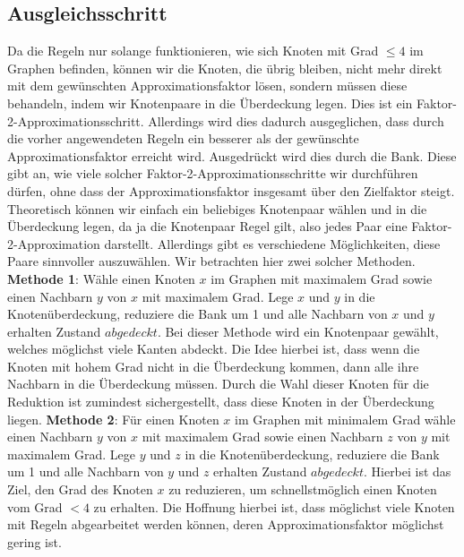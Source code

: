 \documentclass[12pt,onecolumn, notitlepage]{scrartcl}
\begin{document}
\subsection{Ausgleichsschritt}\label{subsec:AS}
Da die Regeln nur solange funktionieren, wie sich Knoten mit Grad $\leq 4$ im Graphen befinden, können wir die Knoten, die übrig bleiben, nicht mehr direkt mit dem gewünschten Approximationsfaktor lösen, sondern müssen diese behandeln, indem wir Knotenpaare in die Überdeckung legen. Dies ist ein Faktor-2-Approximationsschritt. Allerdings wird dies dadurch ausgeglichen, dass durch die vorher angewendeten Regeln ein besserer als der gewünschte Approximationsfaktor erreicht wird. Ausgedrückt wird dies durch die Bank. Diese gibt an, wie viele solcher Faktor-2-Approximationsschritte wir durchführen dürfen, ohne dass der Approximationsfaktor insgesamt über den Zielfaktor steigt.\newline
Theoretisch können wir einfach ein beliebiges Knotenpaar wählen und in die Überdeckung legen, da ja die Knotenpaar Regel gilt, also jedes Paar eine Faktor-2-Approximation darstellt. Allerdings gibt es verschiedene Möglichkeiten, diese Paare sinnvoller auszuwählen. Wir betrachten hier zwei solcher Methoden.\newline \newline
\textbf{Methode 1}: Wähle einen Knoten $x$ im Graphen mit maximalem Grad sowie einen Nachbarn $y$ von $x$ mit maximalem Grad. Lege $x$ und $y$ in die Knotenüberdeckung, reduziere die Bank um 1 und alle Nachbarn von $x$ und $y$ erhalten Zustand $abgedeckt$.  
Bei dieser Methode wird ein Knotenpaar gewählt, welches möglichst viele Kanten abdeckt. Die Idee hierbei ist, dass wenn die Knoten mit hohem Grad nicht in die Überdeckung kommen, dann alle ihre Nachbarn in die Überdeckung müssen. Durch die Wahl dieser Knoten für die Reduktion ist zumindest sichergestellt, dass diese Knoten in der Überdeckung liegen. \newline\newline
\textbf{Methode 2}: Für einen Knoten $x$ im Graphen mit minimalem Grad wähle einen Nachbarn $y$ von $x$ mit maximalem Grad sowie einen Nachbarn $z$ von $y$ mit maximalem Grad. Lege $y$ und $z$ in die Knotenüberdeckung, reduziere die Bank um 1 und alle Nachbarn von $y$ und $z$ erhalten Zustand $abgedeckt$.  
Hierbei ist das Ziel, den Grad des Knoten $x$ zu reduzieren, um schnellstmöglich einen Knoten vom Grad $<4$ zu erhalten. Die Hoffnung hierbei ist, dass möglichst viele Knoten mit Regeln abgearbeitet werden können, deren Approximationsfaktor möglichst gering ist. \newline
\end{document}
